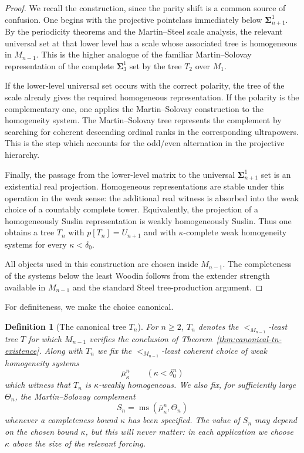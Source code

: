 \documentclass[a4paper,11pt]{article}
\newtheorem{definition}[theorem]{Definition}
\begin{document}
\begin{proof}
We recall the construction, since the parity shift is a common source of confusion.  One begins with the projective pointclass immediately below $\boldsymbol\Sigma^1_{n+1}$.  By the periodicity theorems and the Martin--Steel scale analysis, the relevant universal set at that lower level has a scale whose associated tree is homogeneous in $M_{n-1}$.  This is the higher analogue of the familiar Martin--Solovay representation of the complete $\boldsymbol\Sigma^1_3$ set by the tree $T_2$ over $M_1$.

If the lower-level universal set occurs with the correct polarity, the tree of the scale already gives the required homogeneous representation.  If the polarity is the complementary one, one applies the Martin--Solovay construction to the homogeneity system.  The Martin--Solovay tree represents the complement by searching for coherent descending ordinal ranks in the corresponding ultrapowers.  This is the step which accounts for the odd/even alternation in the projective hierarchy.

Finally, the passage from the lower-level matrix to the universal $\boldsymbol\Sigma^1_{n+1}$ set is an existential real projection.  Homogeneous representations are stable under this operation in the weak sense: the additional real witness is absorbed into the weak choice of a countably complete tower.  Equivalently, the projection of a homogeneously Suslin representation is weakly homogeneously Suslin.  Thus one obtains a tree $T_n$ with $p[T_n]=U_{n+1}$ and with $\kappa$-complete weak homogeneity systems for every $\kappa<\delta_0$.

All objects used in this construction are chosen inside $M_{n-1}$.  The completeness of the systems below the least Woodin follows from the extender strength available in $M_{n-1}$ and the standard Steel tree-production argument.
\end{proof}

For definiteness, we make the choice canonical.

\begin{definition}[The canonical tree $T_n$]\label{def:canonical-tn}
For $n\geq 2$, $T_n$ denotes the $<_{M_{n-1}}$-least tree $T$ for which $M_{n-1}$ verifies the conclusion of Theorem~\ref{thm:canonical-tn-existence}.  Along with $T_n$ we fix the $<_{M_{n-1}}$-least coherent choice of weak homogeneity systems
\[
   \bar\mu^n_\kappa
   \qquad (\kappa<\delta^n_0)
\]
which witness that $T_n$ is $\kappa$-weakly homogeneous.  We also fix, for sufficiently large $\Theta_n$, the Martin--Solovay complement
\[
   S_n=\operatorname{ms}(\bar\mu^n_\kappa,\Theta_n)
\]
whenever a completeness bound $\kappa$ has been specified.  The value of $S_n$ may depend on the chosen bound $\kappa$, but this will never matter: in each application we choose $\kappa$ above the size of the relevant forcing.
\end{definition}
\end{document}
